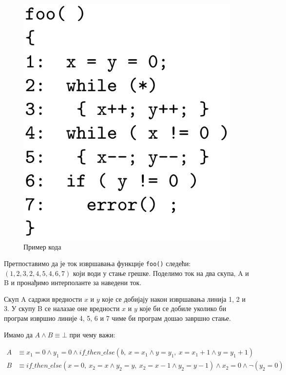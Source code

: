 \documentclass[a4paper]{article}
\begin{document}
{\begin{figure}[h!]
\begin{center}
    \includegraphics[scale=0.17]{./slike/interpolant_code.png}
\end{center}
\caption{Пример кода}
\label{fig:interpolant_example}
\end{figure}
\color{blue}
Претпоставимо да је ток извршавања функције \texttt{foo()} следећи: $(1, 2, 3, 2, 4, 5, 4, 6, 7)$ који
води у стање грешке. \color{black}Поделимо ток на два скупа, A и B и пронађимо интерполанте за наведени ток.

Скуп A садржи вредности $x$ и $y$ које се добијају након извршавања линија 1, 2 и 3. У скупу B се налазае оне вредности $x$ и $y$
које би се добиле уколико би програм извршио линије 4, 5, 6 и 7 чиме би програм дошао завршно стање.

Имамо да $A \land B \equiv \bot$ при чему важи:

\begin{equation*}
\begin{split}
    A & \equiv x_1 = 0 \land y_1 = 0 \land if\_then\_else(b,\  x = x_1 \land y = y_1,\ x = x_1 + 1 \land y = y_1 + 1)     \\
    B & \equiv if\_then\_else(x = 0,\ x_2 = x \land y_2 = y,\ x_2 = x - 1 \land y_2 = y-1) \land x_2 = 0 \land \neg (y_2 = 0)
\end{split}
\end{equation*}

}
\end{document}
